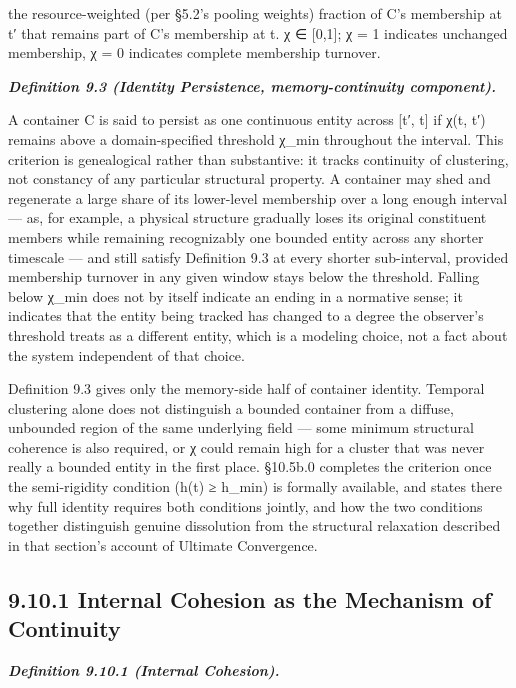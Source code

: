 \documentclass[
]{article}
\begin{document}
the resource-weighted (per §5.2's pooling weights) fraction of C's
membership at t′ that remains part of C's membership at t. χ ∈
{[}0,1{]}; χ = 1 indicates unchanged membership, χ = 0 indicates
complete membership turnover.

\emph{\textbf{Definition 9.3 (Identity Persistence, memory-continuity
component).}}

A container C is said to persist as one continuous entity across {[}t′,
t{]} if χ(t, t′) remains above a domain-specified threshold χ\_min
throughout the interval. This criterion is genealogical rather than
substantive: it tracks continuity of clustering, not constancy of any
particular structural property. A container may shed and regenerate a
large share of its lower-level membership over a long enough interval
--- as, for example, a physical structure gradually loses its original
constituent members while remaining recognizably one bounded entity
across any shorter timescale --- and still satisfy Definition 9.3 at
every shorter sub-interval, provided membership turnover in any given
window stays below the threshold. Falling below χ\_min does not by
itself indicate an ending in a normative sense; it indicates that the
entity being tracked has changed to a degree the observer's threshold
treats as a different entity, which is a modeling choice, not a fact
about the system independent of that choice.

Definition 9.3 gives only the memory-side half of container identity.
Temporal clustering alone does not distinguish a bounded container from
a diffuse, unbounded region of the same underlying field --- some
minimum structural coherence is also required, or χ could remain high
for a cluster that was never really a bounded entity in the first place.
§10.5b.0 completes the criterion once the semi-rigidity condition (h(t)
≥ h\_min) is formally available, and states there why full identity
requires both conditions jointly, and how the two conditions together
distinguish genuine dissolution from the structural relaxation described
in that section's account of Ultimate Convergence.

\hypertarget{internal-cohesion-as-the-mechanism-of-continuity}{%
\subsection{9.10.1 Internal Cohesion as the Mechanism of
Continuity}\label{internal-cohesion-as-the-mechanism-of-continuity}}

\emph{\textbf{Definition 9.10.1 (Internal Cohesion).}}
\end{document}
